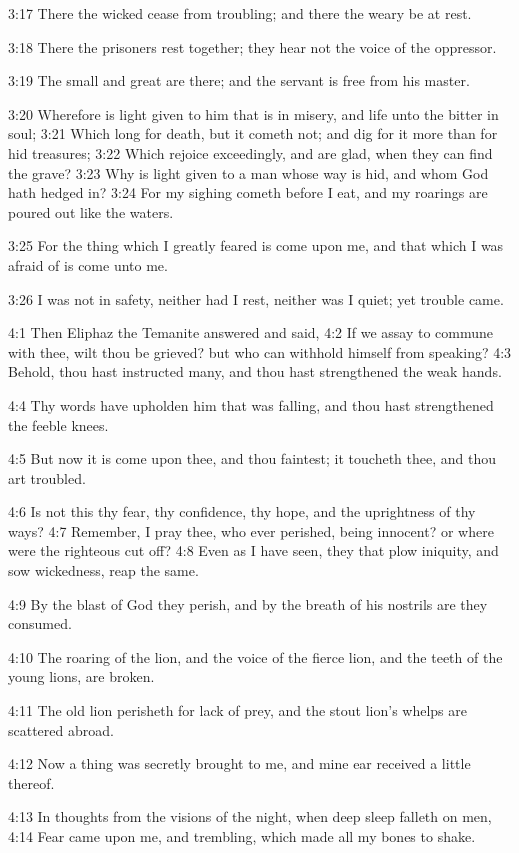 3:17 There the wicked cease from troubling; and there the weary be at
rest.

3:18 There the prisoners rest together; they hear not the voice of the
oppressor.

3:19 The small and great are there; and the servant is free from his
master.

3:20 Wherefore is light given to him that is in misery, and life unto
the bitter in soul; 3:21 Which long for death, but it cometh not; and
dig for it more than for hid treasures; 3:22 Which rejoice
exceedingly, and are glad, when they can find the grave?  3:23 Why is
light given to a man whose way is hid, and whom God hath hedged in?
3:24 For my sighing cometh before I eat, and my roarings are poured
out like the waters.

3:25 For the thing which I greatly feared is come upon me, and that
which I was afraid of is come unto me.

3:26 I was not in safety, neither had I rest, neither was I quiet; yet
trouble came.

4:1 Then Eliphaz the Temanite answered and said, 4:2 If we assay to
commune with thee, wilt thou be grieved? but who can withhold himself
from speaking?  4:3 Behold, thou hast instructed many, and thou hast
strengthened the weak hands.

4:4 Thy words have upholden him that was falling, and thou hast
strengthened the feeble knees.

4:5 But now it is come upon thee, and thou faintest; it toucheth thee,
and thou art troubled.

4:6 Is not this thy fear, thy confidence, thy hope, and the
uprightness of thy ways?  4:7 Remember, I pray thee, who ever
perished, being innocent? or where were the righteous cut off?  4:8
Even as I have seen, they that plow iniquity, and sow wickedness, reap
the same.

4:9 By the blast of God they perish, and by the breath of his nostrils
are they consumed.

4:10 The roaring of the lion, and the voice of the fierce lion, and
the teeth of the young lions, are broken.

4:11 The old lion perisheth for lack of prey, and the stout lion's
whelps are scattered abroad.

4:12 Now a thing was secretly brought to me, and mine ear received a
little thereof.

4:13 In thoughts from the visions of the night, when deep sleep
falleth on men, 4:14 Fear came upon me, and trembling, which made all
my bones to shake.

